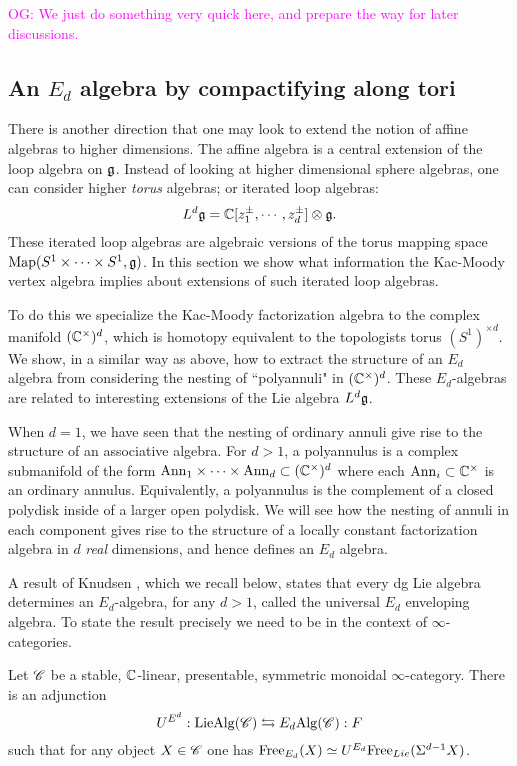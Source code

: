 \documentclass[10pt]{amsart}
\def\owen{\textcolor{magenta}{OG: }\textcolor{magenta}}
\begin{document}
\owen{We just do something very quick here, and prepare the way for later discussions.}

\subsection{An $E_d$ algebra by compactifying along tori} 

There is another direction that one may look to extend the notion of affine algebras to higher dimensions.
The affine algebra is a central extension of the loop algebra on $\mathfrak g$. 
Instead of looking at higher dimensional sphere algebras, one can consider higher {\em torus} algebras; or iterated loop algebras:
\[
L^d \mathfrak g = \mathbb C[z_1^{\pm}, \cdots, z_d^{\pm}] \otimes \mathfrak g .
\]
These iterated loop algebras are algebraic versions of the torus mapping space ${\rm Map}(S^1 \times \cdots \times S^1, \mathfrak g)$. 
In this section we show what information the Kac-Moody vertex algebra implies about extensions of such iterated loop algebras.

To do this we specialize the Kac-Moody factorization algebra to the complex manifold $(\mathbb C^\times)^d$, which is homotopy equivalent to the topologists torus $(S^1)^{\times d}$.  
We show, in a similar way as above, how to extract the structure of an $E_d$ algebra from considering the nesting of ``polyannuli" in $(\mathbb C^\times)^d$.
These $E_d$-algebras are related to interesting extensions of the Lie algebra $L^d \mathfrak g$.

When $d=1$, we have seen that the nesting of ordinary annuli give rise to the structure of an associative algebra. For $d > 1$, a polyannulus is a complex submanifold of the form ${\rm Ann}_1 \times \cdots \times {\rm Ann}_d \subset (\mathbb C^\times)^d$ where each ${\rm Ann}_i \subset \mathbb C^\times$ is an ordinary annulus. Equivalently, a polyannulus is the complement of a closed polydisk inside of a larger open polydisk. We will see how the nesting of annuli in each component gives rise to the structure of a locally constant factorization algebra in $d$ {\em real} dimensions, and hence defines an $E_d$ algebra. 

A result of Knudsen \cite{KnudsenEn}, which we recall below, states that every dg Lie algebra determines an $E_d$-algebra, for any $d>1$, called the universal $E_d$ enveloping algebra.
To state the result precisely we need to be in the context of $\infty$-categories.

\begin{thm} Let $\mathscr C$ be a stable, $\mathbb C$-linear, presentable, symmetric monoidal $\infty$-category.
There is an adjunction
\[
U^{E^d} : {\rm LieAlg}(\mathscr C) \leftrightarrows E_d{\rm Alg} (\mathscr C): F
\]
such that for any object $X \in \mathscr C$ one has ${\rm Free}_{E_d}(X) \simeq U^{E_d} {\rm Free}_{Lie}(\Sigma^{d-1} X)$. 
\end{thm}
\end{document}
